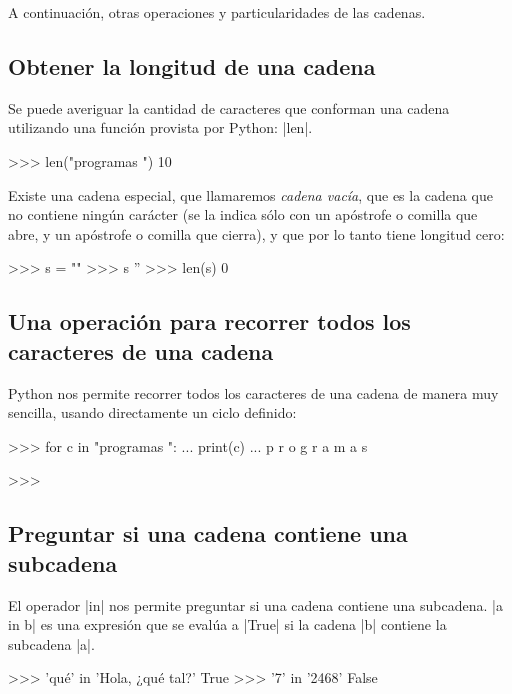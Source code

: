 A continuación, otras operaciones y particularidades de las cadenas.

\subsection{Obtener la longitud de una cadena}

Se puede averiguar la cantidad de caracteres que conforman una cadena
utilizando una función provista por Python: |len|.
\begin{codigo-python-sn}
>>> len("programas ")
10
\end{codigo-python-sn}

Existe una cadena especial, que llamaremos \emph{cadena vacía}, que
es la cadena que no contiene ningún carácter (se la indica sólo con
un apóstrofe o comilla que abre, y un apóstrofe o comilla que cierra),
y que por lo tanto tiene longitud cero:

\begin{codigo-python-sn}
>>> s = ""
>>> s
''
>>> len(s)
0
\end{codigo-python-sn}

\subsection[Recorrer una cadena]{Una operación para recorrer todos los caracteres de una cadena}

Python nos permite recorrer todos los caracteres de una cadena de
manera muy sencilla, usando directamente un ciclo definido:

\begin{codigo-python-sn}
>>> for c in "programas ":
...     print(c)
...
p
r
o
g
r
a
m
a
s

>>>
\end{codigo-python-sn}

\subsection{Preguntar si una cadena contiene una subcadena}

El operador |in| nos permite preguntar si una cadena contiene una
subcadena. |a in b| es una expresión que se evalúa a |True| si la cadena |b|
contiene la subcadena |a|.

\begin{codigo-python-sn}
>>> 'qué' in 'Hola, ¿qué tal?'
True
>>> '7' in '2468'
False
\end{codigo-python-sn}

